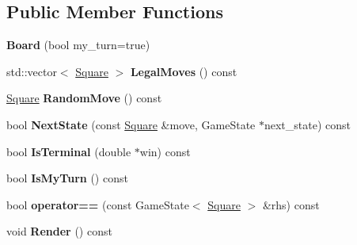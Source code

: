 \subsection*{Public Member Functions}
\begin{DoxyCompactItemize}
\item 
\hypertarget{classdumbo_1_1tic_1_1_board_a9b234c352e04139da4d375dcf0ce3d8e}{{\bfseries Board} (bool my\-\_\-turn=true)}\label{classdumbo_1_1tic_1_1_board_a9b234c352e04139da4d375dcf0ce3d8e}

\item 
\hypertarget{classdumbo_1_1tic_1_1_board_a1f37a5931e50d83527eba709dafc6ae5}{std\-::vector$<$ \hyperlink{structdumbo_1_1tic_1_1_square}{Square} $>$ {\bfseries Legal\-Moves} () const }\label{classdumbo_1_1tic_1_1_board_a1f37a5931e50d83527eba709dafc6ae5}

\item 
\hypertarget{classdumbo_1_1tic_1_1_board_a57b52e433e43323e558442dd09c6b7f2}{\hyperlink{structdumbo_1_1tic_1_1_square}{Square} {\bfseries Random\-Move} () const }\label{classdumbo_1_1tic_1_1_board_a57b52e433e43323e558442dd09c6b7f2}

\item 
\hypertarget{classdumbo_1_1tic_1_1_board_a7b362214b4e0018fd564298d44834e61}{bool {\bfseries Next\-State} (const \hyperlink{structdumbo_1_1tic_1_1_square}{Square} \&move, Game\-State $\ast$next\-\_\-state) const }\label{classdumbo_1_1tic_1_1_board_a7b362214b4e0018fd564298d44834e61}

\item 
\hypertarget{classdumbo_1_1tic_1_1_board_afcb179dde40eeef088cdda515da705cd}{bool {\bfseries Is\-Terminal} (double $\ast$win) const }\label{classdumbo_1_1tic_1_1_board_afcb179dde40eeef088cdda515da705cd}

\item 
\hypertarget{classdumbo_1_1tic_1_1_board_a380495a9e4113a5da8bc7ab927f37f60}{bool {\bfseries Is\-My\-Turn} () const }\label{classdumbo_1_1tic_1_1_board_a380495a9e4113a5da8bc7ab927f37f60}

\item 
\hypertarget{classdumbo_1_1tic_1_1_board_a5d5c5c7448d1451033a508486c72303b}{bool {\bfseries operator==} (const Game\-State$<$ \hyperlink{structdumbo_1_1tic_1_1_square}{Square} $>$ \&rhs) const }\label{classdumbo_1_1tic_1_1_board_a5d5c5c7448d1451033a508486c72303b}

\item 
\hypertarget{classdumbo_1_1tic_1_1_board_a844fcf752e4f9bcc2d2f43e1acbb22fe}{void {\bfseries Render} () const }\label{classdumbo_1_1tic_1_1_board_a844fcf752e4f9bcc2d2f43e1acbb22fe}

\end{DoxyCompactItemize}
